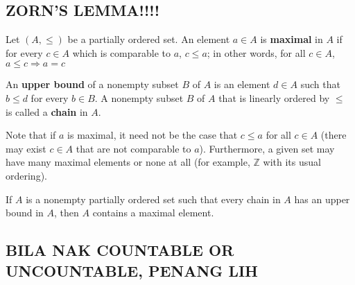 \subsection{ZORN'S LEMMA!!!!}
\begin{definition}
	Let $(A,\leq)$ be a partially ordered set. An element $a \in A$ is \textbf{maximal} in $A$ if for every $c \in A$ which is comparable to $a$, $c \leq a$; in other words, for all $c \in A$, $a \leq c \Rightarrow a = c$
\end{definition}
\begin{definition}
	An \textbf{upper bound} of a nonempty subset $B$ of $A$ is an element $d \in A$ such that $b \leq d$ for every $b \in B$. A nonempty subset $B$ of $A$ that is linearly ordered by $\leq$ is called a \textbf{chain} in $A$.
\end{definition}
\begin{remark}
	Note that if $a$ is maximal, it need not be the case that $c \leq a$ for all $c \in A$ (there may exist $c \in A$ that are not comparable to $a$). Furthermore, a given set may have many maximal elements or none at all (for example, $\mathbb{Z}$ with its usual ordering).
\end{remark}
  
\begin{lemma} \label{lemma-Zorn}
	If $A$ is a nonempty partially ordered set such that every chain in $A$ has an upper bound in $A$, then $A$ contains a maximal element.
\end{lemma}

\begin{comment}
	\begin{theorem} \label{thm-submodule-of-free-module-is-free}
		If $M$ is a free module over a principal ideal domain $R$, then any submodule $N$ of $M$ is free.
	\end{theorem}
\end{comment}


\subsection{BILA NAK COUNTABLE OR UNCOUNTABLE, PENANG LIH}
